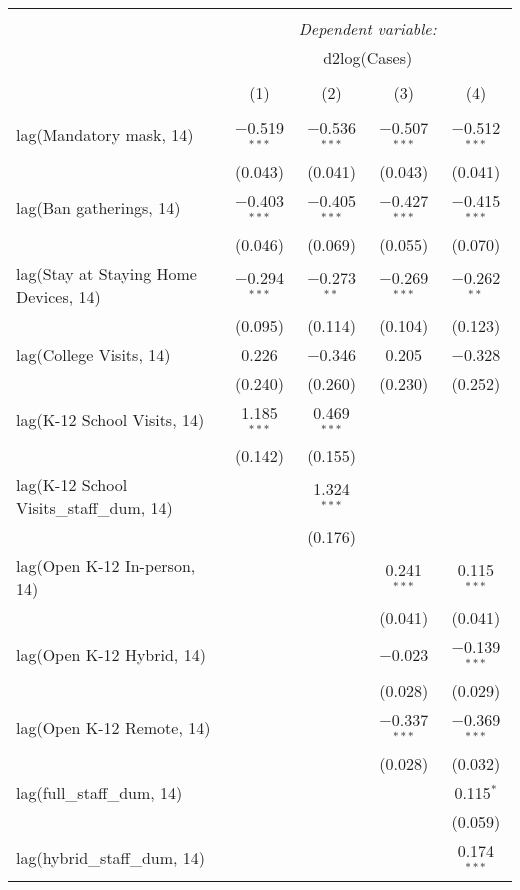 \begin{tabular}{@{\extracolsep{1pt}}lcccc} 
\\[-1.8ex]\hline 
\hline \\[-1.8ex] 
 & \multicolumn{4}{c}{\textit{Dependent variable:}} \\ 
\cline{2-5} 
 & \multicolumn{4}{c}{d2log(Cases)} \\ 
\\[-1.8ex] & (1) & (2) & (3) & (4)\\ 
\hline \\[-1.8ex] 
 lag(Mandatory mask, 14) & $-$0.519$^{***}$ & $-$0.536$^{***}$ & $-$0.507$^{***}$ & $-$0.512$^{***}$ \\ 
  & (0.043) & (0.041) & (0.043) & (0.041) \\ 
  lag(Ban gatherings, 14) & $-$0.403$^{***}$ & $-$0.405$^{***}$ & $-$0.427$^{***}$ & $-$0.415$^{***}$ \\ 
  & (0.046) & (0.069) & (0.055) & (0.070) \\ 
  lag(Stay at Staying Home Devices, 14) & $-$0.294$^{***}$ & $-$0.273$^{**}$ & $-$0.269$^{***}$ & $-$0.262$^{**}$ \\ 
  & (0.095) & (0.114) & (0.104) & (0.123) \\ 
  lag(College Visits, 14) & 0.226 & $-$0.346 & 0.205 & $-$0.328 \\ 
  & (0.240) & (0.260) & (0.230) & (0.252) \\ 
  lag(K-12 School Visits, 14) & 1.185$^{***}$ & 0.469$^{***}$ &  &  \\ 
  & (0.142) & (0.155) &  &  \\ 
  lag(K-12 School Visits\_staff\_dum, 14) &  & 1.324$^{***}$ &  &  \\ 
  &  & (0.176) &  &  \\ 
  lag(Open K-12 In-person, 14) &  &  & 0.241$^{***}$ & 0.115$^{***}$ \\ 
  &  &  & (0.041) & (0.041) \\ 
  lag(Open K-12 Hybrid, 14) &  &  & $-$0.023 & $-$0.139$^{***}$ \\ 
  &  &  & (0.028) & (0.029) \\ 
  lag(Open K-12 Remote, 14) &  &  & $-$0.337$^{***}$ & $-$0.369$^{***}$ \\ 
  &  &  & (0.028) & (0.032) \\ 
  lag(full\_staff\_dum, 14) &  &  &  & 0.115$^{*}$ \\ 
  &  &  &  & (0.059) \\ 
  lag(hybrid\_staff\_dum, 14) &  &  &  & 0.174$^{***}$ \\ 

\end{tabular}
